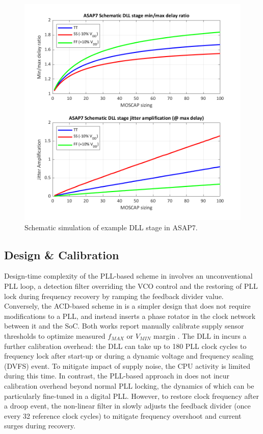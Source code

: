 \documentclass[twoside,9pt,journal,letterpage]{IEEEtran}
\begin{document}
\vspace{-10pt}
\begin{figure}[h]
	\centering
	\includegraphics[width=0.8\columnwidth]{fig_dllasap7}
	\caption{Schematic simulation of example DLL stage in ASAP7.}
	\label{fig:dllasap7}
\end{figure}
\vspace{-15pt}
\subsection{Design \& Calibration}
\label{sec:calibrationoverhead}
Design-time complexity of the PLL-based scheme in \cite{hashimoto2018} involves an unconventional PLL loop, a detection filter overriding the VCO control and the restoring of PLL lock during frequency recovery by ramping the feedback divider value. Conversely, the ACD-based scheme in \cite{wilcox2015} is a simpler design that does not require modifications to a PLL, and instead inserts a phase rotator in the clock network between it and the SoC. Both works report manually calibrate supply sensor thresholds to optimize measured $f_{MAX}$ or $V_{MIN}$ margin \cite{hashimoto2018,wilcox2015}. The DLL in \cite{wilcox2015} incurs a further calibration overhead: the DLL can take up to 180 PLL clock cycles to frequency lock after start-up or during a dynamic voltage and frequency scaling (DVFS) event. To mitigate impact of supply noise, the CPU activity is limited during this time. In contrast, the PLL-based approach in \cite{hashimoto2018} does not incur calibration overhead beyond normal PLL locking, the dynamics of which can be particularly fine-tuned in a digital PLL. However, to restore clock frequency after a droop event, the non-linear filter in \cite{hashimoto2018} slowly adjusts the feedback divider (once every 32 reference clock cycles) to mitigate frequency overshoot and current surges during recovery.
\end{document}
